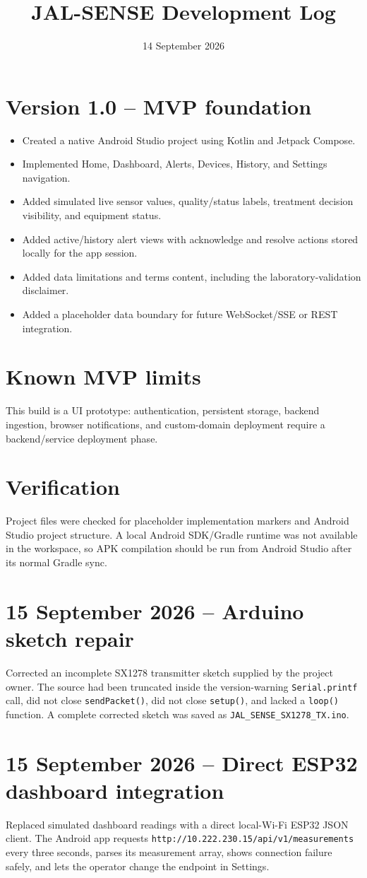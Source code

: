 \documentclass{article}
\begin{document}
\title{JAL-SENSE Development Log}
\date{14 September 2026}
\maketitle
\section*{Version 1.0 -- MVP foundation}
\begin{itemize}
  \item Created a native Android Studio project using Kotlin and Jetpack Compose.
  \item Implemented Home, Dashboard, Alerts, Devices, History, and Settings navigation.
  \item Added simulated live sensor values, quality/status labels, treatment decision visibility, and equipment status.
  \item Added active/history alert views with acknowledge and resolve actions stored locally for the app session.
  \item Added data limitations and terms content, including the laboratory-validation disclaimer.
  \item Added a placeholder data boundary for future WebSocket/SSE or REST integration.
\end{itemize}
\section*{Known MVP limits}
This build is a UI prototype: authentication, persistent storage, backend ingestion, browser notifications, and custom-domain deployment require a backend/service deployment phase.
\section*{Verification}
Project files were checked for placeholder implementation markers and Android Studio project structure. A local Android SDK/Gradle runtime was not available in the workspace, so APK compilation should be run from Android Studio after its normal Gradle sync.
\section*{15 September 2026 -- Arduino sketch repair}
Corrected an incomplete SX1278 transmitter sketch supplied by the project owner. The source had been truncated inside the version-warning \texttt{Serial.printf} call, did not close \texttt{sendPacket()}, did not close \texttt{setup()}, and lacked a \texttt{loop()} function. A complete corrected sketch was saved as \texttt{JAL\_SENSE\_SX1278\_TX.ino}.
\section*{15 September 2026 -- Direct ESP32 dashboard integration}
Replaced simulated dashboard readings with a direct local-Wi-Fi ESP32 JSON client. The Android app requests \texttt{http://10.222.230.15/api/v1/measurements} every three seconds, parses its measurement array, shows connection failure safely, and lets the operator change the endpoint in Settings.
\end{document}
